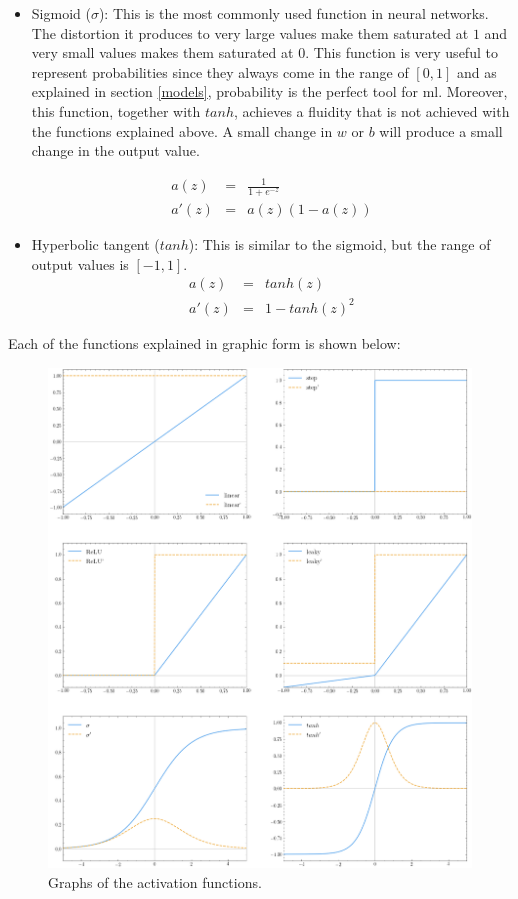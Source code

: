 \begin{itemize}
\item Sigmoid ($\sigma$): This is the most commonly used function in neural networks. The distortion it produces to very large values make them saturated at $1$ and very small values makes them saturated at $0$. This function is very useful to represent probabilities since they always come in the range of $[0, 1]$ and as explained in section \ref{models}, probability is the perfect tool for \acrlong{ml}. Moreover, this function, together with $tanh$, achieves a fluidity that is not achieved with the functions explained above. A small change in $w$ or $b$ will produce a small change in the output value.

\begin{eqnarray}
    a(z) & = & \frac{\mathrm{1} }{\mathrm{1} + e^{-z} } \\
    a'(z) & = & a(z) (1 - a(z))
\end{eqnarray}

\item Hyperbolic tangent ($tanh$): This is similar to the sigmoid, but the range of output values is $[-1,1]$.
\begin{eqnarray}
    a(z) & = & tanh(z) \\
    a'(z) & = & 1 - tanh(z)^2
\end{eqnarray}


\end{itemize}

Each of the functions explained in graphic form is shown below:
\begin{figure}[H]
    \centering
    \includegraphics[width=15cm]{images/state-of-art/activation-functions/activation_functions.png}
    \caption{Graphs of the activation functions.}
    \label{fig:basicneuron}
\end{figure}

